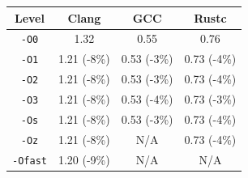 \begin{tabular*}{\columnwidth}{@{\extracolsep\fill}cccc@{\extracolsep\fill}}
\toprule
\textbf{Level} & \textbf{Clang} & \textbf{GCC} & \textbf{Rustc} \\
\midrule
\texttt{-O0} & 1.32 & 0.55 & 0.76 \\
\texttt{-O1} & 1.21 (-8\%) & 0.53 (-3\%) & 0.73 (-4\%) \\
\texttt{-O2} & 1.21 (-8\%) & 0.53 (-3\%) & 0.73 (-4\%) \\
\texttt{-O3} & 1.21 (-8\%) & 0.53 (-4\%) & 0.73 (-3\%) \\
\texttt{-Os} & 1.21 (-8\%) & 0.53 (-3\%) & 0.73 (-4\%) \\
\texttt{-Oz} & 1.21 (-8\%) & N/A & 0.73 (-4\%) \\
\texttt{-Ofast} & 1.20 (-9\%) & N/A & N/A \\
\bottomrule
\end{tabular*}
